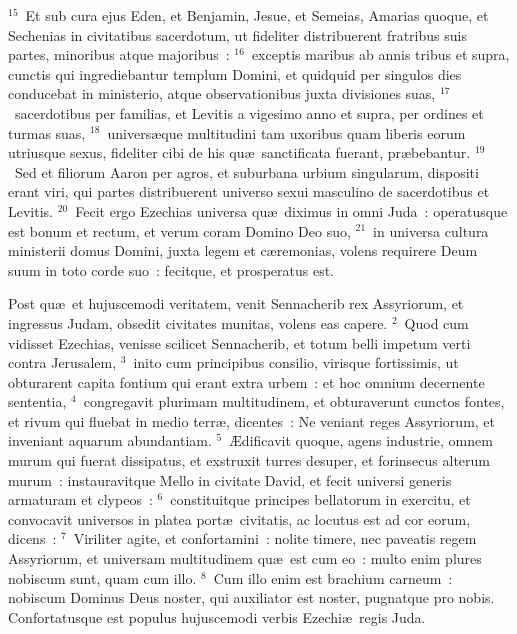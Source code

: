 ${}^{15}$~Et sub cura ejus Eden, et Benjamin, Jesue, et Semeias, Amarias quoque, et Sechenias in civitatibus sacerdotum, ut fideliter distribuerent fratribus suis partes, minoribus atque majoribus~:
${}^{16}$~exceptis maribus ab annis tribus et supra, cunctis qui ingrediebantur templum Domini, et quidquid per singulos dies conducebat in ministerio, atque observationibus juxta divisiones suas,
${}^{17}$~sacerdotibus per familias, et Levitis a vigesimo anno et supra, per ordines et turmas suas,
${}^{18}$~univers\ae que multitudini tam uxoribus quam liberis eorum utriusque sexus, fideliter cibi de his qu\ae\ sanctificata fuerant, pr\ae bebantur.
${}^{19}$~Sed et filiorum Aaron per agros, et suburbana urbium singularum, dispositi erant viri, qui partes distribuerent universo sexui masculino de sacerdotibus et Levitis.
${}^{20}$~Fecit ergo Ezechias universa qu\ae\ diximus in omni Juda~: operatusque est bonum et rectum, et verum coram Domino Deo suo,
${}^{21}$~in universa cultura ministerii domus Domini, juxta legem et c\ae remonias, volens requirere Deum suum in toto corde suo~: fecitque, et prosperatus est.

\bchapter
\lettrine[lines=3,image=true,loversize=0.05,lraise=-0.03]{P}{}ost qu\ae\ et hujuscemodi veritatem, venit Sennacherib rex Assyriorum, et ingressus Judam, obsedit civitates munitas, volens eas capere.
${}^{2}$~Quod cum vidisset Ezechias, venisse scilicet Sennacherib, et totum belli impetum verti contra Jerusalem,
${}^{3}$~inito cum principibus consilio, virisque fortissimis, ut obturarent capita fontium qui erant extra urbem~: et hoc omnium decernente sententia,
${}^{4}$~congregavit plurimam multitudinem, et obturaverunt cunctos fontes, et rivum qui fluebat in medio terr\ae , dicentes~: Ne veniant reges Assyriorum, et inveniant aquarum abundantiam.
${}^{5}$~\AE dificavit quoque, agens industrie, omnem murum qui fuerat dissipatus, et exstruxit turres desuper, et forinsecus alterum murum~: instauravitque Mello in civitate David, et fecit universi generis armaturam et clypeos~:
${}^{6}$~constituitque principes bellatorum in exercitu, et convocavit universos in platea port\ae\ civitatis, ac locutus est ad cor eorum, dicens~:
${}^{7}$~Viriliter agite, et confortamini~: nolite timere, nec paveatis regem Assyriorum, et universam multitudinem qu\ae\ est cum eo~: multo enim plures nobiscum sunt, quam cum illo.
${}^{8}$~Cum illo enim est brachium carneum~: nobiscum Dominus Deus noster, qui auxiliator est noster, pugnatque pro nobis. Confortatusque est populus hujuscemodi verbis Ezechi\ae\ regis Juda.


